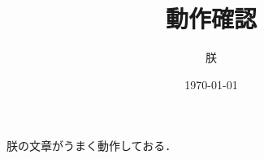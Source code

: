 \documentclass[]{ltjsarticle}
\begin{document}
  \title{動作確認}
  \author{朕}
  \date{\today}
  \maketitle

  朕の文章がうまく動作しておる．
\end{document}
